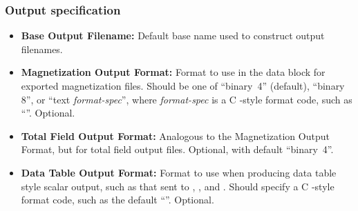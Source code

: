 \subsubsection{Output specification}\label{sec:mif1outspec}
\begin{itemize}
   \item {\bf Base Output Filename:} Default base name used to
      construct output filenames.
   \item {\bf Magnetization Output Format:}
      Format to use in the  data block for exported magnetization
      files.  Should be one of ``binary~4'' (default), ``binary 8'', or
      ``text {\em format-spec}'', where {\em format-spec} is a C
      \cd{printf}-style format code, such as ``\cd{\%\lb~.17g}''.
       Optional.
   \item {\bf Total Field Output Format:}
      Analogous to the Magnetization Output Format, but for total field
      output files.  Optional, with default ``binary~4''.
   \item {\bf Data Table Output Format:}
      Format to use when producing data table style scalar output, such
      as that sent to
      ,
      , and
      .
      Should specify a C -style format code, such as the
      default ``\cd{\%.16g}''.  Optional.
\end{itemize}

